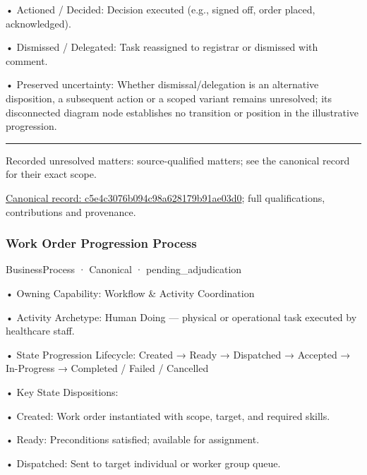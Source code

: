 •
Actioned / Decided: Decision executed (e.g., signed off, order placed, acknowledged).



•
Dismissed / Delegated: Task reassigned to registrar or dismissed with comment.



•
Preserved uncertainty: Whether dismissal/delegation is an alternative disposition, a subsequent action or a scoped variant remains unresolved; its disconnected diagram node establishes no transition or position in the illustrative progression.



\medskip\hrule\medskip

{\small Recorded unresolved matters: source-qualified matters; see the canonical record for their exact scope.}\par
{\footnotesize \href{../../../../continuum/business/business-process/c5e4c3076b094c98a628179b91ae03d0.md}{Canonical record: c5e4c3076b094c98a628179b91ae03d0}; full qualifications, contributions and provenance.}\par
\subsubsection{Work Order Progression Process}

\label{element:73fbbe4e027b4805809fad430e791eba}
{\small BusinessProcess · Canonical · pending\_adjudication}\par

•
Owning Capability: Workflow \& Activity Coordination



•
Activity Archetype: Human Doing — physical or operational task executed by healthcare staff.



•
State Progression Lifecycle: Created → Ready → Dispatched → Accepted → In-Progress → Completed / Failed / Cancelled



•
Key State Dispositions:



•
Created: Work order instantiated with scope, target, and required skills.



•
Ready: Preconditions satisfied; available for assignment.



•
Dispatched: Sent to target individual or worker group queue.



